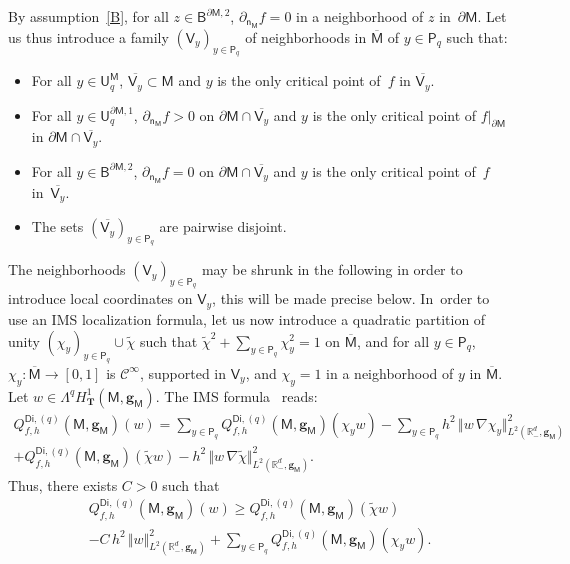 \documentclass[10pt]{amsart}
\newcommand{\mbf}[1]{\mathbf{#1}}
\let\pa\partial
\theoremstyle{plain}
\theoremstyle{definition}
\begin{document}
By assumption~\ref{B}, for all $z\in \mathsf B^{\pa \mathsf M,2}$,
$ \partial_{\mathsf n_{\mathsf M}}f=0$ in a neighborhood of $z$
in~$\pa \mathsf M$. Let us thus introduce a family $(\mathsf
V_y)_{y\in \mathsf P_q}$ of neighborhoods in
$\overline{\mathsf M}$ of $y\in \mathsf P_q$ such that:
\begin{itemize}
\item
For all $y\in \mathsf U^{\mathsf M}_q$, $\overline{\mathsf V_y}\subset \mathsf M$ and $y$ is the only critical point of~$f$ in $\overline{\mathsf V_y}$.
\item
For all $y\in \mathsf U^{\pa \mathsf M,1}_q$, $
\partial_{\mathsf n_{\mathsf M}}f>0$ on $\pa \mathsf M \cap
\overline{\mathsf V_y}$ and $y$ is the only critical point of $f|_{\pa \mathsf M}$ in $\pa \mathsf M \cap \overline{\mathsf V_y}$.
\item
For all $y\in \mathsf B^{\pa \mathsf M,2}$, $ \partial_{\mathsf n_{\mathsf M}}f=0$ on $\pa \mathsf M \cap\overline {\mathsf V_y}$
and $y$ is the only critical point of~$f$ in~$\overline {\mathsf V_y}$.
\item
The sets $(\overline{\mathsf V_y})_{y\in \mathsf P_q}$ are pairwise disjoint.
\end{itemize}
The neighborhoods $(\mathsf V_y)_{y\in \mathsf P_q}$ may be shrunk in the
following in order to introduce local coordinates on $\mathsf V_y$, this will be made precise below. In~order to use an IMS localization formula, let us now introduce a
quadratic partition of unity $(\chi_y)_{y\in \mathsf P_q}\cup \tilde
\chi$ such that $\tilde \chi^2 + \sum_{y\in \mathsf P_q} \chi_y^2 =
1$ on $\overline{\mathsf M}$, and for all $y\in \mathsf P_q$, $\chi_y: \overline{\mathsf M}\to
[0,1]$ is $\mathcal C^\infty$, supported in $\mathsf V_y$, and
$\chi_y=1$ in a neighborhood of $y$ in $\overline{\mathsf M} $.
Let $w\in \Lambda^qH^1_{\mbf T}(\mathsf M,\mbf g_{\mathsf M})$.
The IMS formula~\cite{CFKS,helffer-nier-06} reads:\vspace*{-3pt}
\begin{multline*}
Q_{f,h}^{\mathsf{Di},(q)}(\mathsf M,\mbf g_{\mathsf M})(w) =\sum_{y\in \mathsf P_q} Q_{f,h}^{\mathsf{Di},(q)}(\mathsf M,\mbf g_{\mathsf M})(\chi_y w) -\sum_{y\in \mathsf P_q} h^2\,\big \Vert w\, \nabla \chi_y \big \Vert_{L^2(\mathbb R_-^d,\mbf g_{\mathsf M})}^2\\
+ Q_{f,h}^{\mathsf{Di},(q)}(\mathsf M,\mbf g_{\mathsf M})(\tilde \chi w) - h^2\,\big \Vert w\, \nabla \tilde \chi \big \Vert_{L^2(\mathbb R_-^d,\mbf g_{\mathsf M})}^2.
\end{multline*}
Thus, there exists $C>0$ such that\vspace*{-3pt}
\begin{multline}
\label{eq.IMSfin}
Q_{f,h}^{\mathsf{Di},(q)}(\mathsf M,\mbf g_{\mathsf M})(w) \ge
Q_{f,h}^{\mathsf{Di},(q)}(\mathsf M,\mbf g_{\mathsf M})(\tilde \chi
w)\\
-C\, h^2\, \Vert w \Vert_{L^2(\mathbb R_-^d,\mbf g_{\mathsf
M})}^2
+\sum_{y\in \mathsf P_q} Q_{f,h}^{\mathsf{Di},(q)}(\mathsf M,\mbf g_{\mathsf M})(\chi_y w).
\end{multline}
\end{document}

